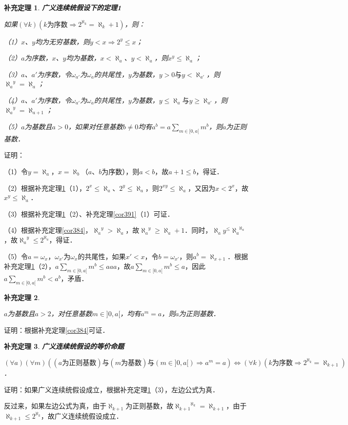 \documentclass[12pt, a4paper, oneside]{book}
\newtheorem{cor}{补充定理}
\begin{document}
			\begin{cor}\label{cor392}
				\textbf{广义连续统假设下的定理1}
				\par
				如果$(\forall k)(k\text{为序数}\Rightarrow 2^{\aleph_k}=\aleph_k+1)$，则：
				\par
				（1）$x$、$y$均为无穷基数，则$y<x\Rightarrow 2^y\leq x$；
				\par
				（2）$a$为序数，$x$、$y$均为基数，$x<\aleph_a$、$y<\aleph_a$，则$x^y\leq \aleph_a$；
				\par
				（3）$a$、$a'$为序数，令$\omega_{a'}$为$\omega_a$的共尾性，$y$为基数，$y>0\text{与}y<\aleph_{a'}$，则${\aleph_a}^y=\aleph_a$；
				\par
				（4）$a$、$a'$为序数，令$\omega_{a'}$为$\omega_a$的共尾性，$y$为基数，$y\leq \aleph_a\text{与}y\geq \aleph_{a'}$，则${\aleph_a}^y=\aleph_{a+1}$；
				\par
				（5）$a$为基数且$a>0$，如果对任意基数$b\neq 0$均有$a^b=a\sum\limits_{m\in [0, a[}m^b$，则$a$为正则基数．
			\end{cor}
			证明：
			\par
			（1）令$y=\aleph_a$，$x=\aleph_b$（$a$、$b$为序数），则$a<b$，故$a+1\leq b$，得证．
			\par
			（2）根据补充定理\ref{cor392}（1），$2^x\leq \aleph_a$、$2^y\leq \aleph_a$，则$2^{xy}\leq \aleph_a$，又因为$x<2^x$，故$x^y\leq \aleph_a$．
			\par
			（3）根据补充定理\ref{cor392}（2）、补充定理\ref{cor391}（1）可证．
			\par
			（4）根据补充定理\ref{cor384}，${\aleph_a}^y>\aleph_a$，故${\aleph_a}^y\geq \aleph_a+1$．同时，$\aleph_ay^\leq {\aleph_a}^{\aleph_a}$，故${\aleph_a}^y\leq 2^{\aleph_a}$，得证．
			\par
			（5）令$a=\omega_x$，$\omega_{x'}$为$\omega_x$的共尾性，如果$x'<x$，令$b=\omega_{x'}$，则$a^b=\aleph_{x+1}$．根据补充定理\ref{cor392}（2），$a\sum\limits_{m\in [0, a[}m^b\leq aaa$，故$a\sum\limits_{m\in [0, a[}m^b\leq a$，因此$a\sum\limits_{m\in [0, a[}m^b<a^b$，矛盾．
			
			\begin{cor}\label{cor393}
				\hfill\par
				$a$为基数且$a>2$，对任意基数$m\in ]0, a[$，均有$a^m=a$，则$a$为正则基数．
			\end{cor}
			证明：根据补充定理\ref{cor384}可证．
			
			\begin{cor}\label{cor394}
				\textbf{广义连续统假设的等价命题}
				\par
				$(\forall a)(\forall m)((a\text{为正则基数})\text{与}(m\text{为基数})\text{与}(m\in ]0, a[)\Rightarrow a^m=a)\Leftrightarrow (\forall k)(k\text{为序数}\Rightarrow 2^{\aleph_k}=\aleph_{k+1})$．
			\end{cor}
			证明：如果广义连续统假设成立，根据补充定理\ref{cor392}（3），左边公式为真．
			\par
			反过来，如果左边公式为真，由于$\aleph_{k+1}$为正则基数，故${\aleph_{k+1}}^{\aleph_k}=\aleph_{k+1}$，由于$\aleph_{k+1}\leq 2^{\aleph_k}$，故广义连续统假设成立．
			
\end{document}
